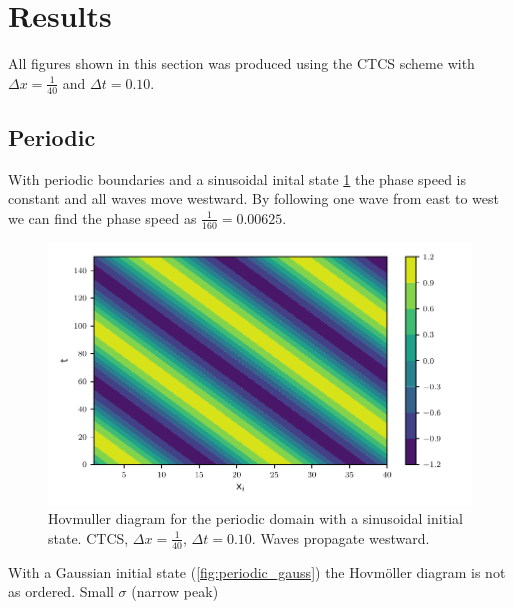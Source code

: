 \newpage
\section{Results}


All figures shown in this section was produced using the CTCS scheme with
$\Delta x = \frac{1}{40} $ and $\Delta t = 0.10$.

\subsection{Periodic}

With periodic boundaries and a sinusoidal inital state \cref{fig:periodic_sine}
the phase speed is constant and all waves move westward. By following one wave
from east to west we can find the phase speed as $\frac{1}{160} = 0.00625$.

\begin{figure}[htp]
  \centering
  \includegraphics[width=\textwidth]{../figures/psi_periodic_centered_short.pdf}
  \caption{Hovmuller diagram for the periodic domain with a sinusoidal initial state. CTCS, $\Delta x = \frac{1}{40}$, $\Delta t = 0.10$. Waves propagate westward.}
  \label{fig:periodic_sine}
\end{figure}

With a Gaussian initial state (\cref{fig:periodic_gauss}) the Hovmöller diagram is not as ordered. Small $\sigma$ (narrow peak)


